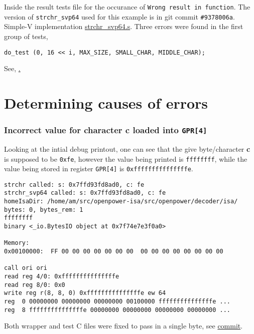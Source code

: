 Inside the result tests file for the occurance of
\texttt{Wrong result in function}.
The version of \texttt{strchr\_svp64} used for this example is in git commit
\texttt{\#9378006a}. Simple-V implementation
\href{https://github.com/ngisearchsvp64/glibc-svp64/blob/9378006a84bdef6af85eb0f810fb62fedc62c588/svp64-port/svp64/strchr_svp64.s}{strchr\_svp64.s}.
Three errors were found in the first group of tests,
\begin{verbatim}
do_test (0, 16 << i, MAX_SIZE, SMALL_CHAR, MIDDLE_CHAR);
\end{verbatim}

See,
\href{https://github.com/ngisearchsvp64/glibc-svp64/blob/9378006a84bdef6af85eb0f810fb62fedc62c588/svp64-port/test-strchr.c#L267}.

\section{Determining causes of errors}
\label{subsec:determine_cause_err}

\subsubsection{Incorrect value for character \textbf{c} loaded into \texttt{GPR[4]}}

Looking at the intial debug printout, one can see that the give byte/character
\textbf{c} is supposed to be \texttt{0xfe}, however the value being printed
is \texttt{ffffffff}, while the value being stored in register \texttt{GPR[4]}
is \texttt{0xfffffffffffffffe}.

\begin{verbatim}
strchr called: s: 0x7ffd93fd8ad0, c: fe
strchr_svp64 called: s: 0x7ffd93fd8ad0, c: fe
homeIsaDir: /home/am/src/openpower-isa/src/openpower/decoder/isa/
bytes: 0, bytes_rem: 1
ffffffff
binary <_io.BytesIO object at 0x7f74e7e3f0a0>

Memory:
0x00100000:  FF 00 00 00 00 00 00 00  00 00 00 00 00 00 00 00

call ori ori
read reg 4/0: 0xfffffffffffffffe
read reg 8/0: 0x0
write reg r(8, 8, 0) 0xfffffffffffffffe ew 64
reg  0 00000000 00000000 00000000 00100000 fffffffffffffffe ...
reg  8 fffffffffffffffe 00000000 00000000 00000000 00000000 ...
\end{verbatim}

Both wrapper and test C files were fixed to pass in a single byte, see
\href{https://github.com/ngisearchsvp64/glibc-svp64/commit/8f1b25340ee2f108027a6f50e365d42aeb7cc939}{commit}.

